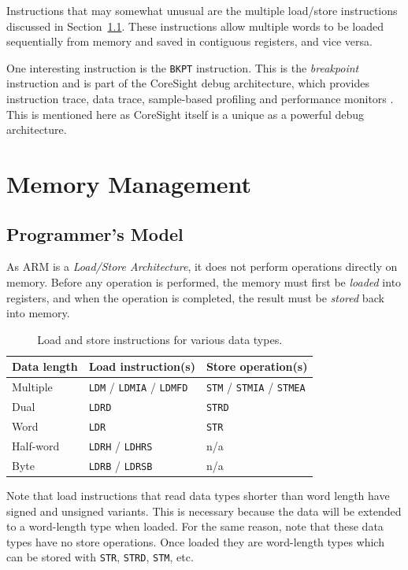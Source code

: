 \documentclass[oneside,a4paper]{report}
\begin{document}
Instructions that may somewhat unusual are the multiple load/store instructions discussed in Section~\ref{sec:memoryprogrammersmodel}. These instructions allow multiple words to be loaded sequentially from memory and saved in contiguous registers, and vice versa.
 
One interesting instruction is the \texttt{BKPT} instruction. This is the \emph{breakpoint} instruction and is part of the CoreSight debug architecture, which provides instruction trace, data trace, sample-based profiling and performance monitors \cite[p. C1-5]{ARMRef}. This is mentioned here as CoreSight itself is a unique as a powerful debug architecture.

\chapter{Memory Management}

\section{Programmer's Model}\label{sec:memoryprogrammersmodel}

As ARM is a \emph{Load/Store Architecture}, it does not perform operations directly on memory. Before any operation is performed, the memory must first be \emph{loaded} into registers, and when the operation is completed, the result must be \emph{stored} back into memory. 

\begin{table}[htb]
	\begin{tabular}{lll}
		\toprule
		Data length	&	Load instruction(s)								&	Store operation(s)								\\
		\midrule
		Multiple	&	\texttt{LDM} / \texttt{LDMIA} / \texttt{LDMFD}	&	\texttt{STM} / \texttt{STMIA} / \texttt{STMEA}	\\
		Dual		&	\texttt{LDRD}									&	\texttt{STRD}									\\
		Word		&	\texttt{LDR}									&	\texttt{STR}									\\
		Half-word   &	\texttt{LDRH} / \texttt{LDHRS}					&	n/a												\\
		Byte        &	\texttt{LDRB} / \texttt{LDRSB}					&	n/a												\\
		\bottomrule		
	\end{tabular}
	\caption{Load and store instructions for various data types.}
	\label{tab:loadstore}
\end{table}

Note that load instructions that read data types shorter than word length have signed and unsigned variants. This is necessary because the data will be extended to a word-length type when loaded. For the same reason, note that these data types have no store operations. Once loaded they are word-length types which can be stored with \texttt{STR}, \texttt{STRD}, \texttt{STM}, etc.
\end{document}
